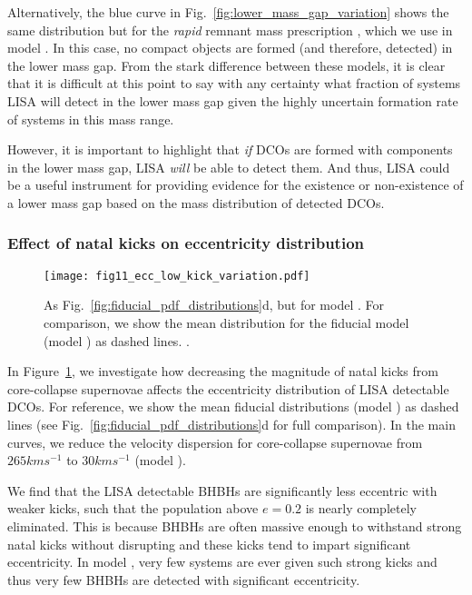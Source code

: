 Alternatively, the blue curve in Fig.~\ref{fig:lower_mass_gap_variation} shows the same distribution but for the \textit{rapid} remnant mass prescription \citep{Fryer+2012}, which we use in model \modRapid{}. In this case, no compact objects are formed (and therefore, detected) in the lower mass gap. From the stark difference between these models, it is clear that it is difficult at this point to say with any certainty what fraction of systems LISA will detect in the lower mass gap given the highly uncertain formation rate of systems in this mass range.

However, it is important to highlight that \textit{if} DCOs are formed with components in the lower mass gap, LISA \textit{will} be able to detect them. And thus, LISA could be a useful instrument for providing evidence for the existence or non-existence of a lower mass gap based on the mass distribution of detected DCOs.

\subsubsection{Effect of natal kicks on eccentricity distribution}

\begin{figure}[tb]
    \centering
    \texttt{[image: fig11\_ecc\_low\_kick\_variation.pdf]}
    \caption{As Fig.~\ref{fig:fiducial_pdf_distributions}d, but for model \modSigLower{}. For comparison, we show the mean distribution for the fiducial model (model \modFid{}) as dashed lines. \href{https://github.com/TomWagg/detecting-DCOs-in-LISA/blob/main/paper/figures/fig11_ecc_low_kick_variation.pdf}{\faFileImage} \href{https://github.com/TomWagg/detecting-DCOs-in-LISA/blob/main/paper/figure_notebooks/variations.ipynb}{\faBook}.}
    \label{fig:ecc_low_kick_variation}
\end{figure}

In Figure~\ref{fig:ecc_low_kick_variation}, we investigate how decreasing the magnitude of natal kicks from core-collapse supernovae affects the eccentricity distribution of LISA detectable DCOs. For reference, we show the mean fiducial distributions (model \modFid{}) as dashed lines (see Fig.~\ref{fig:fiducial_pdf_distributions}d for full comparison). In the main curves, we reduce the velocity dispersion for core-collapse supernovae from $265 \unit{km}{s^{-1}}$ to $30 \unit{km}{s^{-1}}$ (model \modSigLower{}).

We find that the LISA detectable BHBHs are significantly less eccentric with weaker kicks, such that the population above $e = 0.2$ is nearly completely eliminated. This is because BHBHs are often massive enough to withstand strong natal kicks without disrupting and these kicks tend to impart significant eccentricity. In model \modSigLower{}, very few systems are ever given such strong kicks and thus very few BHBHs are detected with significant eccentricity.

